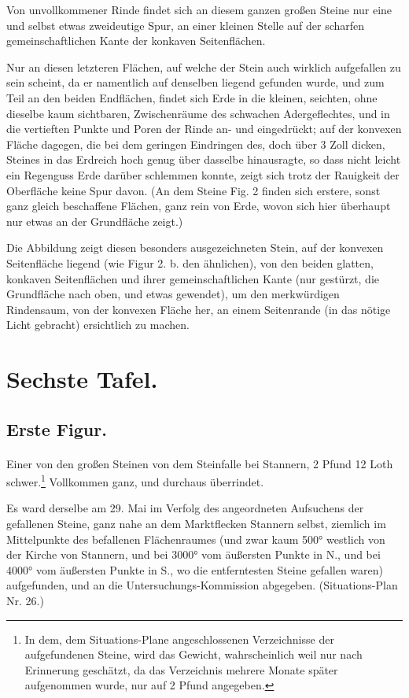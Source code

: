 \documentclass[a4paper, 11pt, oneside, german]{article}
\begin{document}
Von unvollkommener Rinde findet sich an diesem ganzen großen Steine nur eine und selbst etwas zweideutige Spur, an einer kleinen Stelle auf der scharfen gemeinschaftlichen Kante der konkaven Seitenflächen.

Nur an diesen letzteren Flächen, auf welche der Stein auch wirklich aufgefallen zu sein scheint, da er namentlich auf denselben liegend gefunden wurde, und zum Teil an den beiden Endflächen, findet sich Erde in die kleinen, seichten, ohne dieselbe kaum sichtbaren, Zwischenräume des schwachen Adergeflechtes, und in die vertieften Punkte und Poren der Rinde an- und eingedrückt; auf der konvexen Fläche dagegen, die bei dem geringen Eindringen des, doch über 3 Zoll dicken, Steines in das Erdreich hoch genug über dasselbe hinausragte, so dass nicht leicht ein Regenguss Erde darüber schlemmen konnte, zeigt sich trotz der Rauigkeit der Oberfläche keine Spur davon. (An dem Steine Fig. 2 finden sich erstere, sonst ganz gleich beschaffene Flächen, ganz rein von Erde, wovon sich hier überhaupt nur etwas an der Grundfläche zeigt.)

Die Abbildung zeigt diesen besonders ausgezeichneten Stein, auf der konvexen Seitenfläche liegend (wie Figur 2. b. den ähnlichen), von den beiden glatten, konkaven Seitenflächen und ihrer gemeinschaftlichen Kante (nur gestürzt, die Grundfläche nach oben, und etwas gewendet), um den merkwürdigen Rindensaum, von der konvexen Fläche her, an einem Seitenrande (in das nötige Licht gebracht) ersichtlich zu machen.
\clearpage
\section{Sechste Tafel.}
\subsection{Erste Figur.}
\paragraph{}
Einer von den großen Steinen von dem Steinfalle bei Stannern, 2 Pfund 12 Loth schwer.\footnote{In dem, dem Situations-Plane angeschlossenen Verzeichnisse der aufgefundenen Steine, wird das Gewicht, wahrscheinlich weil nur nach Erinnerung geschätzt, da das Verzeichnis mehrere Monate später aufgenommen wurde, nur auf 2 Pfund angegeben.} Vollkommen ganz, und durchaus überrindet.

Es ward derselbe am 29. Mai im Verfolg des angeordneten Aufsuchens der gefallenen Steine, ganz nahe an dem Marktflecken Stannern selbst, ziemlich im Mittelpunkte des befallenen Flächenraumes (und zwar kaum 500° westlich von der Kirche von Stannern, und bei 3000° vom äußersten Punkte in N., und bei 4000° vom äußersten Punkte in S., wo die entferntesten Steine gefallen waren) aufgefunden, und an die Untersuchungs-Kommission abgegeben. (Situations-Plan Nr. 26.)
\end{document}
